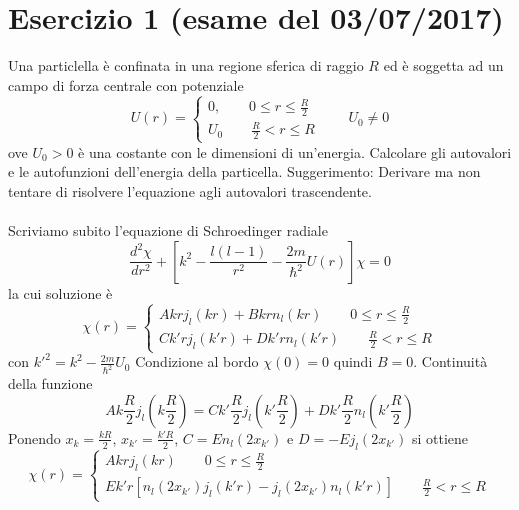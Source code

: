 \documentclass[a4paper]{article}
\begin{document}
    \section*{Esercizio 1 (esame del 03/07/2017)}
    Una particlella è confinata in una regione sferica di raggio $R$ ed è soggetta ad un campo di forza centrale con potenziale
    \begin{equation*}
        U(r)=
        \begin{cases}
            0,\quad\quad 0\leq r\leq\frac{R}{2}\\
            U_0\quad\quad \frac{R}{2}<r\leq R
        \end{cases}
        \quad\quad U_0\neq 0
    \end{equation*}
    ove $U_0 > 0$ è una costante con le dimensioni di un'energia. Calcolare gli autovalori e le autofunzioni dell'energia della particella.
    Suggerimento: Derivare ma non tentare di risolvere l'equazione agli autovalori trascendente.
    \\
    \\
    Scriviamo subito l'equazione di Schroedinger radiale
    \begin{equation*}
        \frac{d^2\chi}{dr^2}+\left[k^2-\frac{l(l-1)}{r^2}-\frac{2m}{\hbar^2}U(r)\right]\chi=0
    \end{equation*}
    la cui soluzione è
    \begin{equation*}
        \chi(r)=
        \begin{cases}
            Akrj_l(kr)+Bkrn_l(kr)\quad\quad 0\leq r\leq\frac{R}{2}\\
            Ck'rj_l(k'r)+Dk'rn_l(k'r)\quad\quad \frac{R}{2}<r\leq R
        \end{cases}
    \end{equation*}
    con $k'^2=k^2-\frac{2m}{\hbar^2}U_0$
    Condizione al bordo $\chi(0)=0$ quindi $B=0$.
    Continuità della funzione
    \begin{equation*}
        Ak\frac{R}{2}j_l(k\frac{R}{2})=Ck'\frac{R}{2}j_l(k'\frac{R}{2})+Dk'\frac{R}{2}n_l(k'\frac{R}{2})
    \end{equation*}
    Ponendo $x_k=\frac{kR}{2}$, $x_{k'}=\frac{k'R}{2}$, $C=En_l(2x_{k'})$ e $D=-Ej_l(2x_{k'})$ si ottiene
    \begin{equation*}
        \chi(r)=
        \begin{cases}
            Akrj_l(kr)\quad\quad 0\leq r\leq\frac{R}{2}\\
            Ek'r\left[n_l(2x_{k'})j_l(k'r)-j_l(2x_{k'})n_l(k'r)\right]\quad\quad \frac{R}{2}<r\leq R
        \end{cases}
    \end{equation*}
\end{document}
